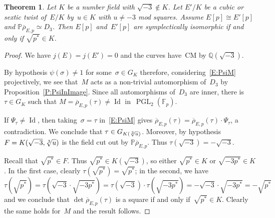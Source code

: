 \documentclass[12pt, reqno]{amsart}
\newcommand{\F}{\mathbb{F}}
\newcommand{\PP}{\mathbb{P}}
\newcommand{\Q}{\mathbb{Q}}
\newcommand{\rhobar}{{\overline{\rho}}}
\newcommand{\PGL}{\operatorname{PGL}}
\DeclareMathOperator{\Id}{Id}
\numberwithin{equation}{section}
\newtheorem{theorem}{Theorem}[section]
\theoremstyle{definition}
\theoremstyle{remark}
\begin{document}
\begin{theorem}\label{T:cubicM} 
Let $K$ be a number field with $\sqrt{-3} \not\in K$. 
Let $E'/K$ be a cubic or sextic twist of~$E/K$ by~$u \in K$ with $u \neq -3$ mod squares. Assume $E[p] \cong E'[p]$
and $\PP \rhobar_{E,p} \simeq D_3$.
Then $E[p]$ and~$E'[p]$ are symplectically isomorphic if and only if
$\sqrt{p^*} \in K$.
\end{theorem}
\begin{proof} We have $j(E)=j(E')=0$ and the curves have~CM by $\Q(\sqrt{-3})$.

By hypothesis $\psi(\sigma) \neq 1$ for some~$\sigma \in G_K$ therefore, 
considering~\eqref{E:PsiM} projectively, we see that~$M$ acts as a non-trivial automorphism of~$D_3$ by Proposition~\ref{P:PsiInImage}.
Since all automorphisms of~$D_3$ are inner, 
there is $\tau \in G_K$ such that 
$M = \rhobar_{E,p}(\tau) \neq \Id$ in~$\PGL_2(\F_p)$.

If $\Psi_\tau \neq \Id$, then   
taking~$\sigma = \tau$ in~\eqref{E:PsiM} 
gives
$\rhobar_{E,p}(\tau) = \rhobar_{E,p}(\tau) \cdot \Psi_\tau$, a contradiction. We conclude that
$\tau \in G_{K(\root3\of{u})}$. 
Moreover, by hypothesis
$F = K(\sqrt{-3},\root3\of{u})$ is
the field cut out by $\PP \rhobar_{E,p}$. 
Thus $\tau(\sqrt{-3}) = - \sqrt{-3}$.

Recall that $\sqrt{p^*} \in F$.
Thus $\sqrt{p^*} \in K(\sqrt{-3})$, so either $\sqrt{p^*} \in K$ or $\sqrt{-3p^*} \in K$. In the first case, clearly $\tau(\sqrt{p^*}) = \sqrt{p^*}$; in the second, we have 
\[
 \tau(\sqrt{p^*}) = \tau(\sqrt{-3}\cdot\sqrt{-3p^*}) = \tau(\sqrt{-3}) \cdot \tau(\sqrt{-3p^*})= - \sqrt{-3} \cdot \sqrt{-3p^*} = - \sqrt{p^*}
\]
and we conclude that $\det \rhobar_{E,p}(\tau)$ is a square if and only if~$\sqrt{p^*} \in K$. Clearly the same holds for~$M$ and the result follows.
\end{proof}
\end{document}
